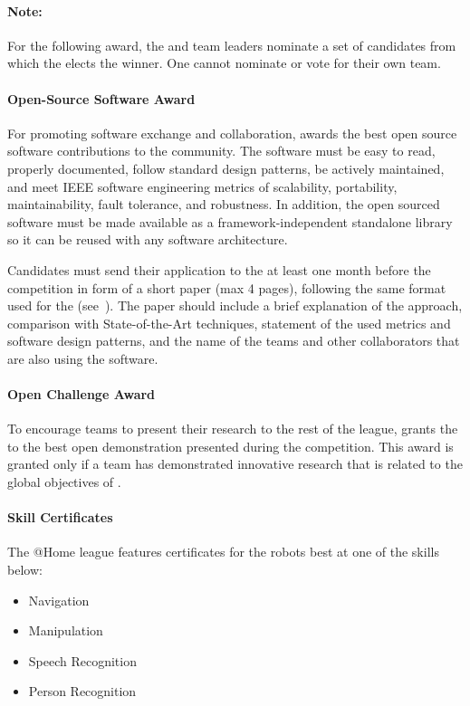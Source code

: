 \paragraph*{Note: } For the following award, the \TC{} and team leaders nominate a set of candidates from which the \EC{} elects the winner. One cannot nominate or vote for their own team.

\paragraph{Open-Source Software Award}
\label{sec:introduction:assaward}
For promoting software exchange and collaboration, \AtHome{} awards the best open source software contributions to the community. The software must be easy to read, properly documented, follow standard design patterns, be actively maintained, and meet IEEE software engineering metrics of scalability, portability, maintainability, fault tolerance, and robustness. In addition, the open sourced software must be made available as a framework-independent standalone library so it can be reused with any software architecture.

Candidates must send their application to the \TC{} at least one month before the competition in form of a short paper (max 4 pages), following the same format used for the \TDP{} (see~). The paper should include a brief explanation of the approach, comparison with State-of-the-Art techniques, statement of the used metrics and software design patterns, and the name of the teams and other collaborators that are also using the software.


\paragraph{Open Challenge Award}
\label{sec:introduction:ocaward}

To encourage teams to present their research to the rest of the league, \AtHome{} grants the \OCAward{} to the best open demonstration presented during the competition. This award is granted only if a team has demonstrated innovative research that is related to the global objectives of \AtHome{}. 


\paragraph{Skill Certificates}
\label{award:skill}
The @Home league features certificates for the robots best at one of the skills below:
\begin{itemize}
	\item Navigation
	\item Manipulation
	\item Speech Recognition
	\item Person Recognition
\end{itemize}


